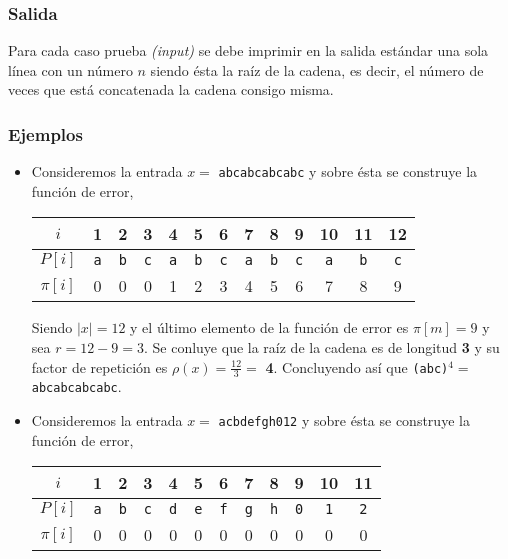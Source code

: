 \subsubsection{Salida}
Para cada caso prueba \textit{(input)} se debe imprimir en la salida estándar una sola línea con un
número $n$ siendo ésta la raíz de la cadena, es decir, el número de veces que está concatenada la
cadena consigo misma.

\subsubsection{Ejemplos}
\begin{itemize}
\item Consideremos la entrada $x =$ \texttt{abcabcabcabc} y sobre ésta se construye la función
de error, 
\begin{table}[h]
\centering
\begin{tabular}{c|c|c|c|c|c|c|c|c|c|c|c|c|}
\cline{2-13}
$i$      & 1          & 2          & 3          & 4          & 5          & 6          & 7          & 8          & 9          & 10         & 11         & 12         \\ \hline
$P[i]$   & \texttt{a} & \texttt{b} & \texttt{c} & \texttt{a} & \texttt{b} & \texttt{c} & \texttt{a} & \texttt{b} & \texttt{c} & \texttt{a} & \texttt{b} & \texttt{c} \\ \hline
$\pi[i]$ & 0          & 0          & 0          & 1          & 2          & 3          & 4          & 5          & 6          & 7          & 8          & 9          \\ \cline{2-13} 
\end{tabular}
\end{table}

Siendo $\vert x \vert = 12$ y el último elemento de la función de error es $\pi[m] = 9$ y sea
$r = 12 - 9 = 3$. Se conluye que la raíz de la cadena es de longitud \textbf{3} y su factor de
repetición es $\rho(x) = \frac{12}{3} =$ \textbf{4}. Concluyendo así que
\texttt{(abc)}$^4 = $ \texttt{abcabcabcabc}.

\item Consideremos la entrada $x =$ \texttt{acbdefgh012} y sobre ésta se construye la función
de error, 
\begin{table}[h]
\centering
\begin{tabular}{c|c|c|c|c|c|c|c|c|c|c|c|}
\cline{2-12}
$i$      & 1          & 2          & 3          & 4          & 5          & 6          & 7          & 8          & 9          & 10         & 11         \\ \hline
$P[i]$   & \texttt{a} & \texttt{b} & \texttt{c} & \texttt{d} & \texttt{e} & \texttt{f} & \texttt{g} & \texttt{h} & \texttt{0} & \texttt{1} & \texttt{2} \\ \hline
$\pi[i]$ & 0          & 0          & 0          & 0          & 0          & 0          & 0          & 0          & 0          & 0          & 0          \\ \cline{2-12} 
\end{tabular}
\end{table}


\end{itemize}
